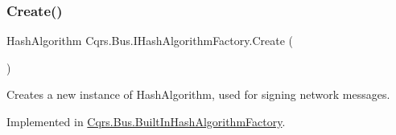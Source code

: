 \subsubsection{\texorpdfstring{Create()}{Create()}}
{\footnotesize\ttfamily Hash\+Algorithm Cqrs.\+Bus.\+I\+Hash\+Algorithm\+Factory.\+Create (\begin{DoxyParamCaption}{ }\end{DoxyParamCaption})}



Creates a new instance of Hash\+Algorithm, used for signing network messages. 



Implemented in \hyperlink{classCqrs_1_1Bus_1_1BuiltInHashAlgorithmFactory_adbfcb13cf0ffe18e405bc6a50f0642f4_adbfcb13cf0ffe18e405bc6a50f0642f4}{Cqrs.\+Bus.\+Built\+In\+Hash\+Algorithm\+Factory}.

